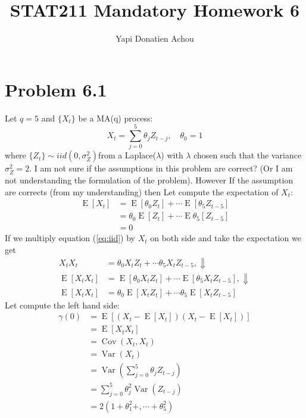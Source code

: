 \documentclass[11pt, oneside]{article}   	%
\title{STAT211 Mandatory Homework 6}
\author{Yapi Donatien Achou}
\newcommand{\Var}{\operatorname{Var}}
\newcommand{\E}{\operatorname{E}}
\newcommand{\Cov}{\operatorname{Cov}}
\begin{document}
\maketitle 
\tableofcontents
\newpage
 
 \section{Problem 6.1}
 Let $q=5$ and $\{ X_{t} \}$ be a MA(q) process:
 \begin{equation}\label{eq:iid}
 X_{t} = \sum_{j=0}^{5}\theta_{j}Z_{t-j}, \quad \theta_{0} = 1
 \end{equation}
where $\{ Z_{t} \} \sim iid(0, \sigma_{Z}^{2})$from a Laplace($\lambda$) with $\lambda$ chosen such that the variance $\sigma_{Z}^{2} = 2$.
I am not sure if the assumptions in this problem are correct? (Or I am not understanding the formulation of the problem). However If the assumption are corrects (from my understanding) then 
Let compute the expectation of $X_{t}$:
\begin{equation}
\begin{split}
\E[X_{t}] &= \E[\theta_{0}Z_{t}] + \cdots \E[\theta_{5}Z_{t-5}]\\
&=\theta_{0}\E[Z_{t}] + \cdots \E\theta_{5}[Z_{t-5}]\\
&=0
\end{split}
\end{equation}
If we multiply equation (\ref{eq:iid}) by $X_{t}$ on both side and take the expectation we get
\begin{equation}
\begin{split}
X_{t}X_{t} &= \theta_{0}X_{t}Z_{t} + \cdots \theta_{5}X_{t}Z_{t-5} , \Downarrow\\
\E[X_{t}X_{t}] &= \E[\theta_{0}X_{t}Z_{t}] + \cdots \E[\theta_{5}X_{t}Z_{t-5}] , \Downarrow\\
\E[X_{t}X_{t}] &= \theta_{0}\E[X_{t}Z_{t}] + \cdots \theta_{5}\E[X_{t}Z_{t-5}] 
\end{split}
\end{equation}
Let compute the left hand side:
\begin{equation}
\begin{split}
\gamma(0) &= \E[(X_{t}-\E[X_{t}])(X_{t}-\E[X_{t}])]\\
&=\E[X_{t}X_{t}]\\
&= \Cov(X_{t},X_{t})\\
&=\Var(X_{t})\\
&=\Var\left( \sum_{j=0}^{5} \theta_{j}Z_{t-j}\right)\\
&=\sum_{j=0}^{5} \theta_{j}^{2}\Var(Z_{t-j})\\
&=2(1+\theta_{1}^{2} +, \cdots+\theta_{5}^{2})
\end{split}
\end{equation}
\end{document}
